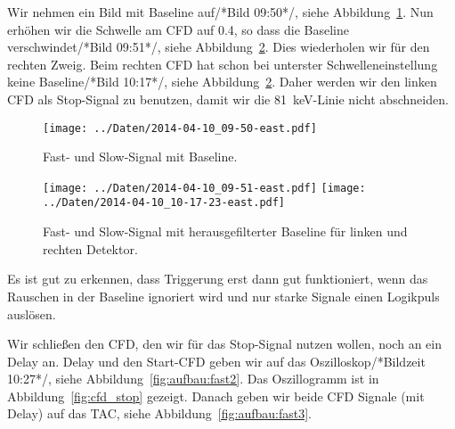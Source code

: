 Wir nehmen ein Bild mit Baseline auf/*Bild 09:50*/, siehe
Abbildung~\ref{fig:cfd_einstellen_baseline}. Nun erhöhen wir die Schwelle am
CFD auf \num{0.4}, so dass die Baseline verschwindet/*Bild 09:51*/, siehe
Abbildung~\ref{fig:cfd_einstellen}. Dies wiederholen wir für den rechten Zweig.
Beim rechten CFD hat schon bei unterster Schwelleneinstellung keine
Baseline/*Bild 10:17*/, siehe Abbildung~\ref{fig:cfd_einstellen}. Daher werden
wir den linken CFD als Stop-Signal zu benutzen, damit wir die
\SI{81}{\kilo\electronvolt}-Linie nicht abschneiden.

\begin{figure}[htbp]
    \texttt{[image: ../Daten/2014-04-10\_09-50-east.pdf]}
    \caption{%
        Fast- und Slow-Signal mit Baseline.
    }
    \label{fig:cfd_einstellen_baseline}
\end{figure}

\begin{figure}[htbp]
    \centering
    \texttt{[image: ../Daten/2014-04-10\_09-51-east.pdf]}
    \hfill
    \texttt{[image: ../Daten/2014-04-10\_10-17-23-east.pdf]}
    \caption{%
        Fast- und Slow-Signal mit herausgefilterter Baseline für linken und
        rechten Detektor.
    }
    \label{fig:cfd_einstellen}
\end{figure}

Es ist gut zu erkennen, dass Triggerung erst dann gut funktioniert, wenn das
Rauschen in der Baseline ignoriert wird und nur starke Signale einen Logikpuls
auslösen.

Wir schließen den CFD, den wir für das Stop-Signal nutzen wollen, noch an ein
Delay an. Delay und den Start-CFD geben wir auf das Oszilloskop/*Bildzeit
10:27*/, siehe Abbildung~\ref{fig:aufbau:fast2}. Das Oszillogramm ist in
Abbildung~\ref{fig:cfd_stop} gezeigt. Danach geben wir beide CFD Signale
(mit Delay) auf das TAC, siehe Abbildung~\ref{fig:aufbau:fast3}.

